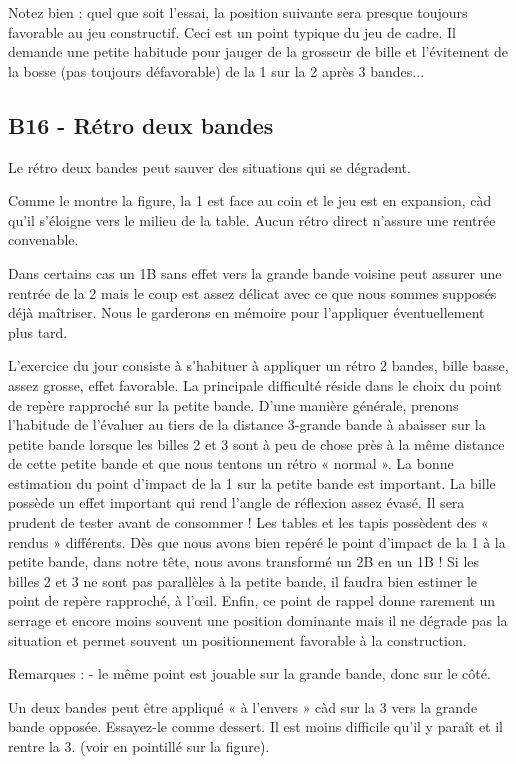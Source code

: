Notez bien : quel que soit l'essai, la position suivante sera presque
toujours favorable au jeu constructif. Ceci est un point typique du jeu
de cadre. Il demande une petite habitude pour jauger de la grosseur de
bille et l'évitement de la bosse (pas toujours défavorable) de la 1 sur
la 2 après 3 bandes...

\subsection{B16 - Rétro deux bandes}\label{b16---ruxe9tro-deux-bandes}

Le rétro deux bandes peut sauver des situations qui se dégradent.

Comme le montre la figure, la 1 est face au coin et le jeu est en
expansion, càd qu'il s'éloigne vers le milieu de la table. Aucun rétro
direct n'assure une rentrée convenable.

Dans certains cas un 1B sans effet vers la grande bande voisine peut
assurer une rentrée de la 2 mais le coup est assez délicat avec ce que
nous sommes supposés déjà maîtriser. Nous le garderons en mémoire pour
l'appliquer éventuellement plus tard.

L'exercice du jour consiste à s'habituer à appliquer un rétro 2 bandes,
bille basse, assez grosse, effet favorable. La principale difficulté
réside dans le choix du point de repère rapproché sur la petite bande.
D'une manière générale, prenons l'habitude de l'évaluer au tiers de la
distance 3-grande bande à abaisser sur la petite bande lorsque les
billes 2 et 3 sont à peu de chose près à la même distance de cette
petite bande et que nous tentons un rétro « normal ». La bonne
estimation du point d'impact de la 1 sur la petite bande est important.
La bille possède un effet important qui rend l'angle de réflexion assez
évasé. Il sera prudent de tester avant de consommer ! Les tables et les
tapis possèdent des « rendus » différents. Dès que nous avons bien
repéré le point d'impact de la 1 à la petite bande, dans notre tête,
nous avons transformé un 2B en un 1B ! Si les billes 2 et 3 ne sont pas
parallèles à la petite bande, il faudra bien estimer le point de repère
rapproché, à l'œil. Enfin, ce point de rappel donne rarement un serrage
et encore moins souvent une position dominante mais il ne dégrade pas la
situation et permet souvent un positionnement favorable à la
construction.

Remarques : - le même point est jouable sur la grande bande, donc sur le
côté.

Un deux bandes peut être appliqué « à l'envers » càd sur la 3 vers la
grande bande opposée. Essayez-le comme dessert. Il est moins difficile
qu'il y paraît et il rentre la 3. (voir en pointillé sur la figure).

